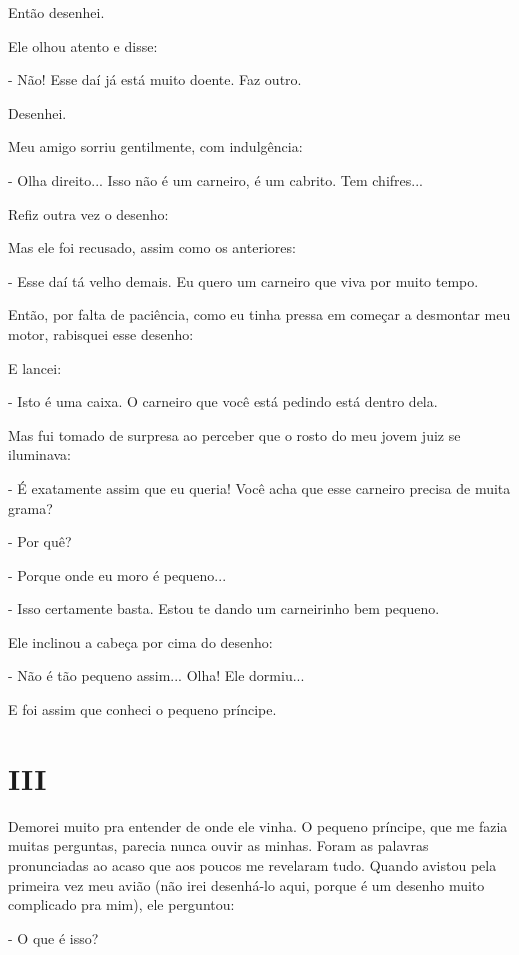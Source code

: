 \begin{Parallel}[p]{}{}
{Então desenhei.

Ele olhou atento e disse:

- Não! Esse daí já está muito doente. Faz outro.

Desenhei.

Meu amigo sorriu gentilmente, com indulgência:

- Olha direito... Isso não é um carneiro, é um cabrito. Tem chifres...

Refiz outra vez o desenho:

Mas ele foi recusado, assim como os anteriores:

- Esse daí tá velho demais. Eu quero um carneiro que viva por muito
tempo.

Então, por falta de paciência, como eu tinha pressa em começar a
desmontar meu motor, rabisquei esse desenho:

E lancei:

- Isto é uma caixa. O carneiro que você está pedindo está dentro dela.

Mas fui tomado de surpresa ao perceber que o rosto do meu jovem juiz se
iluminava:

- É exatamente assim que eu queria! Você acha que esse carneiro precisa
de muita grama?

- Por quê?

- Porque onde eu moro é pequeno...

- Isso certamente basta. Estou te dando um carneirinho bem pequeno.

Ele inclinou a cabeça por cima do desenho:

- Não é tão pequeno assim... Olha! Ele dormiu...

E foi assim que conheci o pequeno príncipe.

}
\ParallelPar

\end{Parallel}

\chapter{III}

Demorei muito pra entender de onde ele vinha. O pequeno príncipe, que me
fazia muitas perguntas, parecia nunca ouvir as minhas. Foram as palavras
pronunciadas ao acaso que aos poucos me revelaram tudo. Quando avistou
pela primeira vez meu avião (não irei desenhá-lo aqui, porque é um
desenho muito complicado pra mim), ele perguntou:

- O que é isso?

